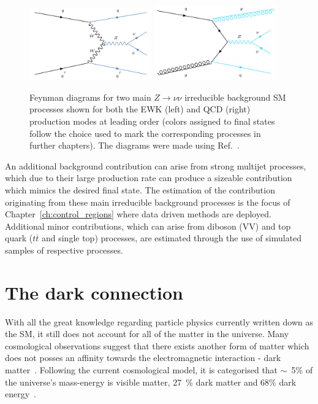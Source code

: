 \begin{figure}[htbp]
    \begin{center}
        \includegraphics[width=0.47\textwidth]{Theory/ewk_znunu.png}
        \includegraphics[width=0.47\textwidth]{Theory/qcd_znunu.png}
        \caption{Feynman diagrams for two main $Z\rightarrow \nu\nu$ irreducible background SM processes shown for both the EWK (left) and QCD (right) production modes at leading order (colors assigned to final states follow the choice used to mark the corresponding processes in further chapters). The diagrams were made using Ref.~\cite{fey_diag}.}
      \label{fig:znunu_diagram}
    \end{center}
  \end{figure}


\hspace{10pt} An additional background contribution can arise from strong multijet processes, which due to their large production rate can produce a sizeable contribution which mimics the desired final state. The estimation of the contribution originating from these main irreducible background processes is the focus of Chapter~\ref{ch:control_regions} where data driven methods are deployed. Additional minor contributions, which can arise from diboson (VV) and top quark ($t\overline{t}$ and single top) processes, are estimated through the use of simulated samples of respective processes.

\section{The dark connection}
\label{sec:dm}
\hspace{10pt} With all the great knowledge regarding particle physics currently written down as the SM, it still does not account for all of the matter in the universe. Many cosmological observations suggest that there exists another form of matter which does not posses an affinity towards the electromagnetic interaction - dark matter~\cite{intro_dm}. Following the current cosmological model, it is categorised that $\sim$~5\% of the universe's mass-energy is visible matter, 27~\% dark matter and 68\% dark energy~\cite{paper:dm_composition}.

